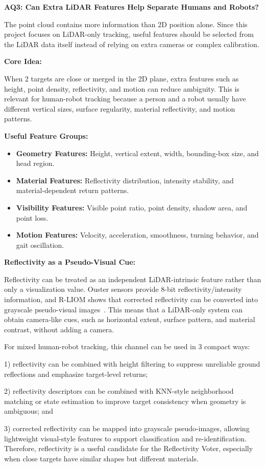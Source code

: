 \documentclass[11pt,a4paper]{report}
\newcommand{\boxitemtitle}[1]{
    \vspace{0.5em}
    {\large\textbf{\color{DeepBlue} #1}}\par
    \vspace{0.8em}
}
\begin{document}
\newpage
\boxitemtitle{AQ3: Can Extra LiDAR Features Help Separate Humans and Robots?}
\begin{contentbox}
The point cloud contains more information than 2D position alone. Since this project focuses on LiDAR-only tracking, useful features should be selected from the LiDAR data itself instead of relying on extra cameras or complex calibration.

\vspace{1.0em}
\textbf{Core Idea:}

When 2 targets are close or merged in the 2D plane, extra features such as height, point density, reflectivity, and motion can reduce ambiguity. This is relevant for human-robot tracking because a person and a robot usually have different vertical sizes, surface regularity, material reflectivity, and motion patterns.

\vspace{0.8em}
\textbf{Useful Feature Groups:}
\begin{itemize}[leftmargin=*]
    \item \textbf{Geometry Features:} Height, vertical extent, width, bounding-box size, and head region.
    \item \textbf{Material Features:} Reflectivity distribution, intensity stability, and material-dependent return patterns.
    \item \textbf{Visibility Features:} Visible point ratio, point density, shadow area, and point loss.
    \item \textbf{Motion Features:} Velocity, acceleration, smoothness, turning behavior, and gait oscillation.
\end{itemize}

\vspace{0.8em}
\textbf{Reflectivity as a Pseudo-Visual Cue:}

Reflectivity can be treated as an independent LiDAR-intrinsic feature rather than only a visualization value. Ouster sensors provide 8-bit reflectivity/intensity information, and R-LIOM shows that corrected reflectivity can be converted into grayscale pseudo-visual images~\cite{dong2023rliom}. This means that a LiDAR-only system can obtain camera-like cues, such as horizontal extent, surface pattern, and material contrast, without adding a camera.

For mixed human-robot tracking, this channel can be used in 3 compact ways: 


1) reflectivity can be combined with height filtering to suppress unreliable ground reflections and emphasize target-level returns; 


2) reflectivity descriptors can be combined with KNN-style neighborhood matching or state estimation to improve target consistency when geometry is ambiguous; and 


3) corrected reflectivity can be mapped into grayscale pseudo-images, allowing lightweight visual-style features to support classification and re-identification. Therefore, reflectivity is a useful candidate for the Reflectivity Voter, especially when close targets have similar shapes but different materials.
\end{contentbox}
\end{document}
